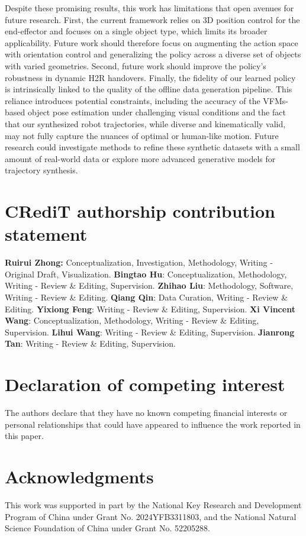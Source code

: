 \documentclass[final,5p,times,twocolumn]{elsarticle}
\begin{document}
Despite these promising results, this work has limitations that open avenues for future research. First, the current framework relies on 3D position control for the end-effector and focuses on a single object type, which limits its broader applicability. Future work should therefore focus on augmenting the action space with orientation control and generalizing the policy across a diverse set of objects with varied geometries. Second, future work should improve the policy's robustness in dynamic H2R handovers. Finally, the fidelity of our learned policy is intrinsically linked to the quality of the offline data generation pipeline. This reliance introduces potential constraints, including the accuracy of the VFMs-based object pose estimation under challenging visual conditions and the fact that our synthesized robot trajectories, while diverse and kinematically valid, may not fully capture the nuances of optimal or human-like motion. Future research could investigate methods to refine these synthetic datasets with a small amount of real-world data or explore more advanced generative models for trajectory synthesis.


\section*{CRediT authorship contribution statement}
\textbf{Ruirui Zhong:} Conceptualization, Investigation, Methodology, Writing - Original Draft, Visualization. \textbf{Bingtao Hu}: Conceptualization, Methodology, Writing - Review \& Editing, Supervision. \textbf{Zhihao Liu}: Methodology, Software, Writing - Review \& Editing. \textbf{Qiang Qin}: Data Curation, Writing - Review \& Editing. \textbf{Yixiong Feng}: Writing - Review \& Editing, Supervision. \textbf{Xi Vincent Wang}: Conceptualization, Methodology, Writing - Review \& Editing, Supervision. \textbf{Lihui Wang}:  Writing - Review \& Editing, Supervision. \textbf{Jianrong Tan}:  Writing - Review \& Editing, Supervision.

\section*{Declaration of competing interest}
The authors declare that they have no known competing financial interests or personal relationships that could have appeared to influence the work reported in this paper.

\section*{Acknowledgments}
This work was supported in part by the National Key Research and Development Program of China under Grant No. 2024YFB3311803, and the National Natural Science Foundation of China under Grant No. 52205288.




\end{document}
